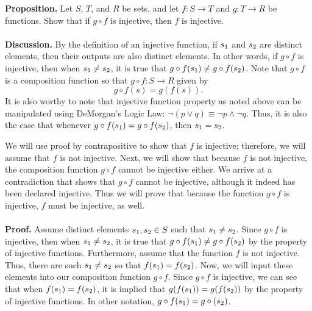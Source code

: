 \documentclass[12pt]{exam}
\begin{document}
\begin{questions}
\question
\textbf{Proposition.} Let $S$, $T$, and $R$ be sets, and let $f: S \rightarrow T$ and $g: T \rightarrow R$ be functions. Show that if $g \circ f$ is injective, then $f$ is injective.
\\
\\\textbf{Discussion.} By the definition of an injective function, if $s\textsubscript{1}$ and $s\textsubscript{2}$ are distinct elements, then their outputs are also distinct elements. In other words, if $g \circ f$ is injective, then when $s\textsubscript{1} \neq s\textsubscript{2}$, it is true that $g \circ f(s\textsubscript{1}) \neq g \circ f(s\textsubscript{2})$. Note that $g \circ f$ is a composition function so that $g \circ f: S \rightarrow R$ given by 
\begin{equation*}
g \circ f(s) = g(f(s)).
\end{equation*}
It is also worthy to note that injective function property as noted above can be manipulated using DeMorgan's Logic Law: $\neg(p \vee q) \equiv \neg p \wedge \neg q$. Thus, it is also the case that whenever $g \circ f(s\textsubscript{1}) = g \circ f(s\textsubscript{2})$, then $s\textsubscript{1} = s\textsubscript{2}$.
\par
We will use proof by contrapositive to show that $f$ is injective; therefore, we will assume that $f$ is not injective. Next, we will show that because $f$ is not injective, the composition function $g \circ f$ cannot be injective either. We arrive at a contradiction that shows that $g \circ f$ cannot be injective, although it indeed has been declared injective. Thus we will prove that because the function $g \circ f$ is injective, $f$ must be injective, as well.
\\
\\\textbf{Proof.} Assume distinct elements $s\textsubscript{1}, s\textsubscript{2} \in S$ such that $s\textsubscript{1} \neq s\textsubscript{2}$. Since $g \circ f$ is injective, then when $s\textsubscript{1} \neq s\textsubscript{2}$, it is true that $g \circ f(s\textsubscript{1}) \neq g \circ f(s\textsubscript{2})$ by the property of injective functions. Furthermore, assume that the function $f$ is not injective. Thus, there are such $s\textsubscript{1} \neq s\textsubscript{2}$ so that $f(s\textsubscript{1}) = f(s\textsubscript{2})$. Now, we will input these elements into our composition function $g \circ f$. Since $g \circ f$ is injective, we can see that when  $f(s\textsubscript{1}) = f(s\textsubscript{2})$, it is implied that  $g(f(s\textsubscript{1})) = g(f(s\textsubscript{2}))$ by the property of injective functions. In other notation, $g \circ f(s\textsubscript{1}) = g \circ (s\textsubscript{2})$. 

\end{questions}
\end{document}
